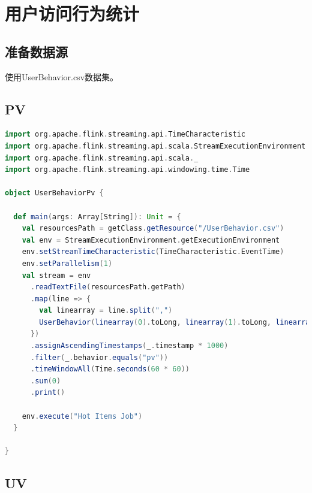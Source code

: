 \documentclass[oneside]{ctexbook}
\begin{document}
\section{用户访问行为统计}

\subsection{准备数据源}

使用UserBehavior.csv数据集。

\subsection{PV}

\begin{lstlisting}[language=scala]
import org.apache.flink.streaming.api.TimeCharacteristic
import org.apache.flink.streaming.api.scala.StreamExecutionEnvironment
import org.apache.flink.streaming.api.scala._
import org.apache.flink.streaming.api.windowing.time.Time

object UserBehaviorPv {

  def main(args: Array[String]): Unit = {
    val resourcesPath = getClass.getResource("/UserBehavior.csv")
    val env = StreamExecutionEnvironment.getExecutionEnvironment
    env.setStreamTimeCharacteristic(TimeCharacteristic.EventTime)
    env.setParallelism(1)
    val stream = env
      .readTextFile(resourcesPath.getPath)
      .map(line => {
        val linearray = line.split(",")
        UserBehavior(linearray(0).toLong, linearray(1).toLong, linearray(2).toInt, linearray(3), linearray(4).toLong)
      })
      .assignAscendingTimestamps(_.timestamp * 1000)
      .filter(_.behavior.equals("pv"))
      .timeWindowAll(Time.seconds(60 * 60))
      .sum(0)
      .print()

    env.execute("Hot Items Job")
  }

}
\end{lstlisting}

\subsection{UV}
\end{document}
